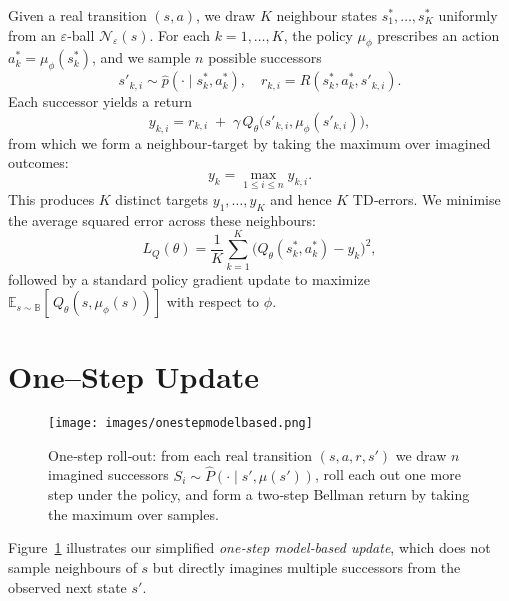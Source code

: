\documentclass[11pt,a4paper]{report}
\begin{document}
Given a real transition \((s,a)\), we draw \(K\) neighbour states \(s^*_1,\dots,s^*_K\) uniformly from an \(\varepsilon\)‐ball \(\mathcal N_{\varepsilon}(s)\). For each \(k=1,\dots,K\), the policy \(\mu_\phi\) prescribes an action \(a^*_k=\mu_\phi(s^*_k)\), and we sample \(n\) possible successors 
\[
  s'_{k,i}\sim\hat p(\cdot\mid s^*_k,a^*_k),
  \quad
  r_{k,i}=R(s^*_k,a^*_k,s'_{k,i}).
\]
Each successor yields a return
\[
  y_{k,i}
  = r_{k,i} \;+\;\gamma\,Q_\theta\bigl(s'_{k,i},\mu_\phi(s'_{k,i})\bigr),
\]
from which we form a neighbour‐target by taking the maximum over imagined outcomes:
\[
  y_k = \max_{1\le i\le n} y_{k,i}.
\]
This produces \(K\) distinct targets \(y_1,\dots,y_K\) and hence \(K\) TD‐errors. We minimise the average squared error across these neighbours:
\[
  L_Q(\theta)
  = \frac{1}{K}\sum_{k=1}^K \bigl(Q_\theta(s^{*}_k, a^{*}_k) - y_k\bigr)^{2},
\]
followed by a standard policy gradient update to maximize \(\mathbb E_{s\sim\mathbb B}[\,Q_\theta(s,\mu_\phi(s))]\) with respect to \(\phi\).








\section{One–Step Update}
\label{sec:one_step_mbu}

\begin{figure}[htbp]
  \centering
  \texttt{[image: images/onestepmodelbased.png]}
  \caption{One‐step roll‐out: from each real transition \((s,a,r,s')\) we draw \(n\) imagined successors \(S_i\sim\hat P(\cdot\mid s',\mu(s'))\), roll each out one more step under the policy, and form a two‐step Bellman return by taking the maximum over samples.}
  \label{fig:one_step_diag}
\end{figure}

Figure~\ref{fig:one_step_diag} illustrates our simplified \emph{one‐step model‐based update}, which does not sample neighbours of \(s\) but directly imagines multiple successors from the observed next state \(s'\).
\end{document}
